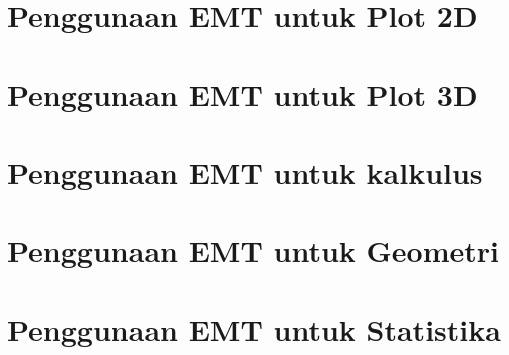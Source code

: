 \documentclass{report}
\begin{document}
\newpage
\chapter{Penggunaan EMT untuk Plot 2D}


\newpage
\chapter{Penggunaan EMT untuk Plot 3D}


\newpage
\chapter{Penggunaan EMT untuk kalkulus}


\newpage
\chapter{Penggunaan EMT untuk Geometri}


\newpage
\chapter{Penggunaan EMT untuk Statistika}

\end{document}
